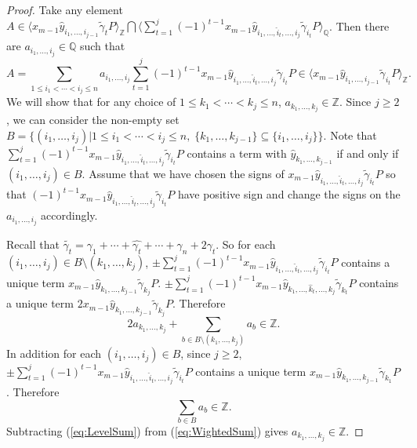 \documentclass{article}
\theoremstyle{plain}
\theoremstyle{definition}
\numberwithin{thm}{section}
\begin{document}
\begin{proof}
				Take any element
				$A\in\langle x_{m-1}\hat{y}_{i_1,\dots,i_{j-1}}\tilde{\gamma}_tP \rangle_{\mathbb{Z}}
				\bigcap\langle\sum_{t=1}^j{(-1)^{t-1}x_{m-1}\hat{y}_{i_1,\dots,\hat{i}_t,\dots,i_j}\tilde{\gamma}_{i_t}P}\rangle_{\mathbb{Q}}$.
				Then there are $a_{i_1,\dots,i_j}\in \mathbb{Q}$ such that
				\begin{equation*}
					A=\sum_{1\leq i_1<\cdots<i_j\leq n}a_{i_1,\dots,i_j}\sum_{t=1}^j{(-1)^{t-1}x_{m-1}\hat{y}_{i_1,\dots,\hat{i}_t,\dots,i_j}\tilde{\gamma}_{i_t}P}
					\in \langle x_{m-1}\hat{y}_{i_1,\dots,i_{j-1}}\tilde{\gamma}_{i_t}P \rangle_{\mathbb{Z}}.
				\end{equation*}
				We will show that for any choice of $1\leq k_1 <\cdots<k_{j}\leq n$, $a_{k_1,\dots,k_j}\in \mathbb{Z}$.
				Since $j \geq 2$,
				we can consider the non-empty set $B=\{ (i_1,\dots,i_j) | 1\leq i_1<\cdots<i_j\leq n,\; \{k_1,\dots,k_{j-1}\} \subseteq \{i_1,\dots,i_j\} \}$.
				Note that $\sum_{t=1}^j{(-1)^{t-1}x_{m-1}\hat{y}_{i_1,\dots,\hat{i}_t,\dots,i_j}\tilde{\gamma}_{i_t}P}$
				contains a term with $\hat{y}_{k_1,\dots,k_{j-1}}$ if and only if $(i_1,\dots,i_j)\in B$.
				Assume that we have chosen the signs of $x_{m-1}\hat{y}_{i_1,\dots,\hat{i}_t,\dots,i_j}\tilde{\gamma}_{i_t}P$
				so that $(-1)^{t-1}x_{m-1}\hat{y}_{i_1,\dots,\hat{i}_t,\dots,i_j}\tilde{\gamma}_{i_t}P$ 
				have positive sign and change the signs on the $a_{i_1,\dots,i_j}$ accordingly. 
				
				Recall that $\tilde{\gamma_t}=\gamma_1+\cdots+\hat{\gamma_t}+\cdots+\gamma_n+2\gamma_t$.
				So for each $(i_1,\dots,i_j)\in B\setminus(k_1,\dots,k_j)$,
				$\pm\sum_{t=1}^j{(-1)^{t-1}x_{m-1}\hat{y}_{i_1,\dots,\hat{i}_t,\dots,i_j}\tilde{\gamma}_{i_t}P}$
				contains a unique term $x_{m-1}\hat{y}_{k_1,\dots,k_{j-1}}\tilde{\gamma}_{k_j}P$.
				\newline
				$\pm\sum_{t=1}^j{(-1)^{t-1}x_{m-1}\hat{y}_{k_1,\dots,\hat{k}_t,\dots,k_j}\tilde{\gamma}_{k_t}P}$
				contains a unique term $2x_{m-1}\hat{y}_{k_1,\dots,k_{j-1}}\tilde{\gamma}_{k_j}P$.
				Therefore
				\begin{equation}\label{eq:WightedSum}
					2a_{k_1,\dots,k_j}+\sum_{b\in B\setminus(k_1,\dots,k_j)}{a_b}\in \mathbb{Z}.
				\end{equation}
				In addition for each $(i_1,\dots,i_j)\in B$, since $j \geq 2$,
				$\pm\sum_{t=1}^j{(-1)^{t-1}x_{m-1}\hat{y}_{i_1,\dots,\hat{i}_t,\dots,i_j}\tilde{\gamma}_{i_t}P}$
				contains a unique term $x_{m-1}\hat{y}_{k_1,\dots,k_{j-1}}\tilde{\gamma}_{k_1}P$.
				Therefore
				\begin{equation}\label{eq:LevelSum}
					\sum_{b\in B}{a_b}\in \mathbb{Z}.  
				\end{equation}
				Subtracting (\ref{eq:LevelSum}) from (\ref{eq:WightedSum}) gives $a_{k_1,\dots,k_j}\in \mathbb{Z}$.
				

\end{proof}
\end{document}
